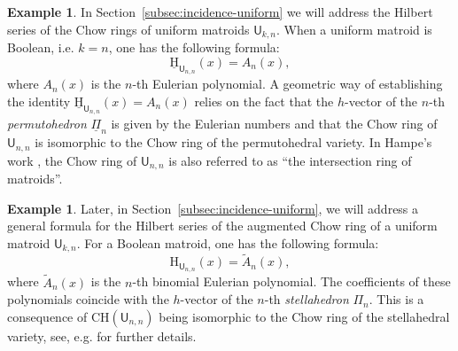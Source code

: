 \documentclass[11pt, a4paper, english]{amsart}
\theoremstyle{teoremas}
\theoremstyle{definition}
\newtheorem{example}[theorem]{Example}
\newcommand{\U}{\mathsf{U}}
\renewcommand{\H}{\mathrm{H}}
\newcommand{\CH}{\mathrm{CH}}
\newcommand{\uH}{\underline{\mathrm{H}}}
\begin{document}
\begin{example}
    In Section~\ref{subsec:incidence-uniform} we will address the Hilbert series of the Chow rings of uniform matroids $\U_{k,n}$. When a uniform matroid is Boolean, i.e. $k=n$, one has the following formula:
    \[ \uH_{\U_{n,n}}(x) = A_n(x),\]
    where $A_n(x)$ is the $n$-th Eulerian polynomial. A geometric way of establishing the identity $\uH_{\U_{n,n}}(x) = A_n(x)$ relies on the fact that the $h$-vector of the $n$-th \emph{permutohedron} $\underline{\Pi}_n$ is given by the Eulerian numbers and that the Chow ring of $\U_{n,n}$ is isomorphic to the Chow ring of the permutohedral variety. In Hampe's work \cite{hampe}, the Chow ring of $\U_{n,n}$ is also referred to as ``the intersection ring of matroids''.
\end{example}

\begin{example}
    Later, in Section~\ref{subsec:incidence-uniform}, we will address a general formula for the Hilbert series of the augmented Chow ring of a uniform matroid $\U_{k,n}$. For a Boolean matroid, one has the following formula:
    \[ \H_{\U_{n,n}}(x) = \widetilde{A}_n(x),\]
    where $\widetilde{A}_n(x)$ is the $n$-th binomial Eulerian polynomial. The coefficients of these polynomials coincide with the $h$-vector of the $n$-th \emph{stellahedron} $\Pi_n$. This is a consequence of $\CH(\U_{n,n})$ being isomorphic to the Chow ring of the stellahedral variety, see, e.g. \cite{stellahedral} for further details. 
\end{example}
\end{document}
